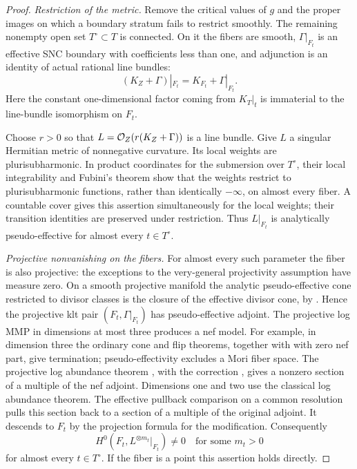 \begin{proof}
\emph{Restriction of the metric.}
Remove the critical values of $g$ and the proper images on which a
boundary stratum fails to restrict smoothly.  The remaining nonempty
open set $T^\circ\subset T$ is connected.  On it the fibers are smooth,
$\Gamma|_{F_t}$ is an effective SNC boundary with coefficients less than
one, and adjunction is an identity of actual rational line bundles:
\begin{equation}\label{eq:supply-fiber-adjunction}
 (K_Z+\Gamma)|_{F_t}=K_{F_t}+\Gamma|_{F_t}.
\end{equation}
Here the constant one-dimensional factor coming from
$K_T|_t$ is immaterial to the line-bundle isomorphism on $F_t$.

Choose $r>0$ so that $L=\mathcal O_Z(r(K_Z+\Gamma))$ is a line bundle.  Give $L$
a singular Hermitian metric of nonnegative curvature.  Its local weights
are plurisubharmonic.  In product coordinates for the submersion over
$T^\circ$, their local integrability and Fubini's theorem show that the
weights restrict to plurisubharmonic functions, rather than identically
$-\infty$, on almost every fiber.  A countable cover gives this assertion
simultaneously for the local weights; their transition identities are
preserved under restriction.  Thus $L|_{F_t}$ is analytically
pseudo-effective for almost every $t\in T^\circ$.

\smallskip\noindent
\emph{Projective nonvanishing on the fibers.}
For almost every such parameter the fiber is also projective: the
exceptions to the very-general projectivity assumption have measure
zero.  On a smooth projective manifold the analytic pseudo-effective
cone restricted to divisor classes is the closure of the effective
divisor cone, by \cite[Proposition~1.2]{BDPP2013}.  Hence the projective
klt pair $(F_t,\Gamma|_{F_t})$ has pseudo-effective adjoint.  The
projective log MMP in dimensions at most three produces a nef model.
For example, in dimension three the ordinary cone and flip theorems,
together with \cite[Theorem~1.2]{CT2023} with zero nef part, give
termination; pseudo-effectivity excludes a Mori fiber space.  The
projective log abundance theorem
\cite[Theorem~1.1]{KMMAbundance1994}, with the correction
\cite[\S6.1]{MatsukiCorrection2003}, gives a nonzero section of a
multiple of the nef adjoint.  Dimensions one and two use the classical
log abundance theorem.  The effective pullback comparison on a common
resolution pulls this section back to a section of a multiple of the
original adjoint.  It descends to $F_t$ by the projection formula for the
modification.  Consequently
\begin{equation}\label{eq:supply-ae-nonvanishing}
 H^0(F_t,L^{\otimes m_t}|_{F_t})\ne0
 \quad\text{for some }m_t>0
\end{equation}
for almost every $t\in T^\circ$.  If the fiber is a point this assertion
holds directly.


\end{proof}
